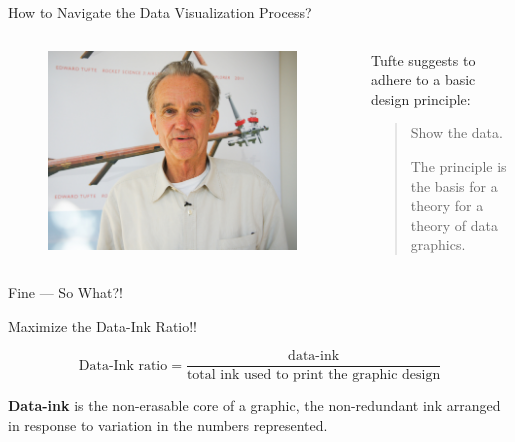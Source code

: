 \documentclass[aspectratio=1610]{beamer}
\begin{document}
\begin{frame}{How to Navigate the Data Visualization Process?}{}
	\begin{columns}
		\begin{column}{0.5\textwidth}
			\begin{figure}
				\includegraphics[width=0.95\textwidth]
				{images/edward-tufte.jpeg}
			\end{figure}
		\end{column}
		\begin{column}{0.5\textwidth}
			Tufte \cite[][page 92]{tufte2001} suggests to adhere to a
			basic design principle:

			\begin{quote}

				\vspace{1em}


				Show the data.

				\vspace{1em}

				The principle is the basis for a theory
				for a theory of data graphics.
			\end{quote}
		\end{column}
	\end{columns}
\end{frame}

\begin{frame}{}{}
	\LARGE \centering Fine --- So What?!
\end{frame}

\begin{frame}{Maximize the Data-Ink Ratio!!}{}
	\begin{center}
		\begin{equation*}
			\text{Data-Ink ratio} = \frac{
				\text{data-ink}
			}
			{
				\text{total ink used to print the graphic design}
			}
		\end{equation*}
	\end{center}

	\vspace{2em}

	\textbf{Data-ink} is the non-erasable core of a graphic, the
	non-redundant ink arranged in response to variation in the numbers
	represented.
\end{frame}
\end{document}
